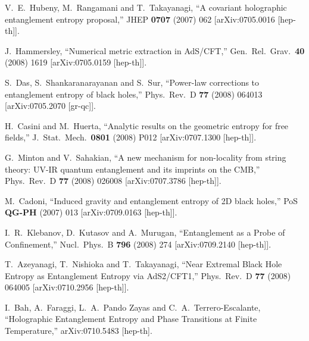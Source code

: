 \documentclass[12pt]{article}
\begin{document}
\begin{thebibliography}{99}
  V.~E.~Hubeny, M.~Rangamani and T.~Takayanagi,
  ``A covariant holographic entanglement entropy proposal,''
  JHEP {\bf 0707} (2007) 062
  [arXiv:0705.0016 [hep-th]].

  J.~Hammersley,
  ``Numerical metric extraction in AdS/CFT,''
  Gen.\ Rel.\ Grav.\  {\bf 40} (2008) 1619
  [arXiv:0705.0159 [hep-th]].

  S.~Das, S.~Shankaranarayanan and S.~Sur,
  ``Power-law corrections to entanglement entropy of black holes,''
  Phys.\ Rev.\  D {\bf 77} (2008) 064013
  [arXiv:0705.2070 [gr-qc]].

  H.~Casini and M.~Huerta,
  ``Analytic results on the geometric entropy for free fields,''
  J.\ Stat.\ Mech.\  {\bf 0801} (2008) P012
  [arXiv:0707.1300 [hep-th]].

  G.~Minton and V.~Sahakian,
  ``A new mechanism for non-locality from string theory: UV-IR quantum
  entanglement and its imprints on the CMB,''
  Phys.\ Rev.\  D {\bf 77} (2008) 026008
  [arXiv:0707.3786 [hep-th]].

  M.~Cadoni,
  ``Induced gravity and entanglement entropy of 2D black holes,''
  PoS {\bf QG-PH} (2007) 013
  [arXiv:0709.0163 [hep-th]].

  I.~R.~Klebanov, D.~Kutasov and A.~Murugan,
  ``Entanglement as a Probe of Confinement,''
  Nucl.\ Phys.\  B {\bf 796} (2008) 274
  [arXiv:0709.2140 [hep-th]].

  T.~Azeyanagi, T.~Nishioka and T.~Takayanagi,
  ``Near Extremal Black Hole Entropy as Entanglement Entropy via AdS2/CFT1,''
  Phys.\ Rev.\  D {\bf 77} (2008) 064005
  [arXiv:0710.2956 [hep-th]].

  I.~Bah, A.~Faraggi, L.~A.~Pando Zayas and C.~A.~Terrero-Escalante,
  ``Holographic Entanglement Entropy and Phase Transitions at Finite
  Temperature,''
  arXiv:0710.5483 [hep-th].


\end{thebibliography}
\end{document}
